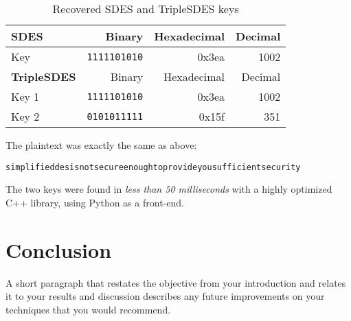 \documentclass[a4paper,english,12pt]{article}
\begin{document}
\begin{table}
  \centering
  \begin{tabular}{@{}lrrr@{}}
    \toprule
    \textbf{SDES} & Binary & Hexadecimal & Decimal \\
    \midrule
    Key & \texttt{1111101010} & 0x3ea & 1002 \\

    \toprule
    \textbf{TripleSDES} & Binary & Hexadecimal & Decimal \\
    \midrule
    Key 1 & \texttt{1111101010} & 0x3ea & 1002 \\
    Key 2 & \texttt{0101011111} & 0x15f &  351 \\
    \bottomrule
  \end{tabular}
  \caption{Recovered SDES and TripleSDES keys}
  \label{table:keys}
\end{table}

The plaintext was exactly the same as above:
\begin{verbatim}
simplifieddesisnotsecureenoughtoprovideyousufficientsecurity
\end{verbatim}

The two keys were found in \textit{less than 50 milliseconds} with a highly optimized
C++ library, using Python as a front-end.

\section{Conclusion}

A short paragraph that restates the objective from your introduction and
relates it to your results and discussion describes any future improvements on
your techniques that you would recommend.



\end{document}
